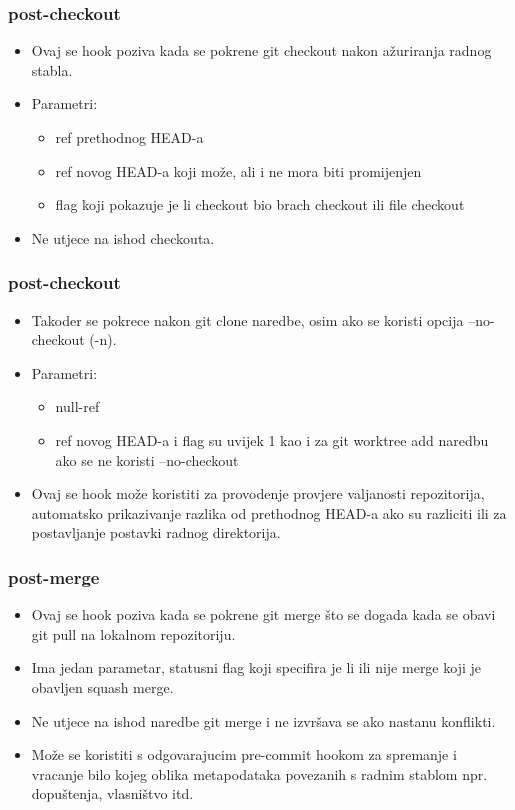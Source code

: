 \documentclass{beamer}
\begin{document}
\begin{frame}
\frametitle{post-checkout}
\begin{itemize}
    \item Ovaj se hook poziva kada se pokrene git checkout nakon ažuriranja radnog stabla.
    \item Parametri:
    \begin{itemize}
	    \item ref prethodnog HEAD-a
	    \item ref novog HEAD-a koji može, ali i ne mora biti promijenjen
	    \item flag koji pokazuje je li checkout bio brach checkout ili file checkout
	\end{itemize}
    \item Ne utjece na ishod checkouta.
\end{itemize}
\end{frame}
\begin{frame}
\frametitle{post-checkout}
\begin{itemize}
    \item Takoder se pokrece nakon git clone naredbe, osim ako se koristi opcija --no-checkout (-n).
    \item Parametri:
    \begin{itemize}
        \item null-ref
        \item ref novog HEAD-a i flag su uvijek 1 kao i za git worktree add naredbu ako se ne koristi --no-checkout
    \end{itemize}
    \item Ovaj se hook može koristiti za provodenje provjere valjanosti repozitorija, automatsko prikazivanje razlika od prethodnog HEAD-a ako su razliciti ili za postavljanje postavki radnog direktorija.
\end{itemize}
\end{frame}
	
\begin{frame}
\frametitle{post-merge}
\begin{itemize}
    \item Ovaj se hook poziva kada se pokrene git merge što se dogada kada se obavi git pull na lokalnom repozitoriju.
    \item Ima jedan parametar, statusni flag koji specifira je li ili nije merge koji je obavljen squash merge.
    \item Ne utjece na ishod naredbe git merge i ne izvršava se ako nastanu konflikti.
    \item Može se koristiti s odgovarajucim pre-commit hookom za spremanje i vracanje bilo kojeg oblika metapodataka povezanih s radnim stablom npr. dopuštenja, vlasništvo itd.
\end{itemize}
\end{frame}
\end{document}
